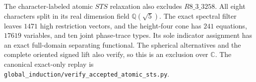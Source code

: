 The character-labeled atomic $STS$ relaxation also excludes
$R8\_3\_3258$. All eight characters split in its real dimension field
$\mathbb Q(\sqrt5)$. The exact spectral filter leaves $1471$ high
restriction vectors, and the height-four cone has $241$ equations,
$17619$ variables, and ten joint phase-trace types. Its sole indicator
assignment has an exact full-domain separating functional. The
spherical alternatives and the complete oriented signed lift also
verify, so this is an exclusion over $\mathbb C$.
The canonical exact-only replay is
\texttt{global\_induction/verify\_accepted\_atomic\_sts.py}.
